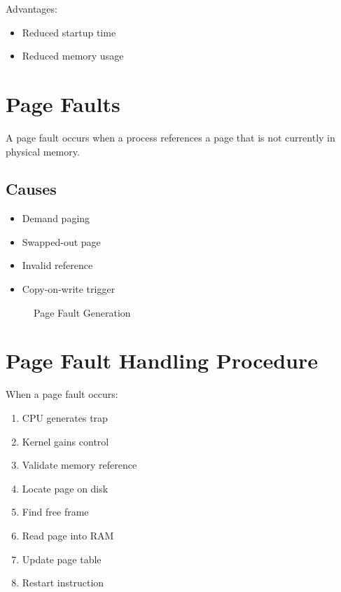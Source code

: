 Advantages:

\begin{itemize}
\item Reduced startup time
\item Reduced memory usage
\end{itemize}

\section{Page Faults}

A page fault occurs when a process references a page that is not currently in physical memory.

\subsection{Causes}

\begin{itemize}
\item Demand paging
\item Swapped-out page
\item Invalid reference
\item Copy-on-write trigger
\end{itemize}

\begin{figure}[H]
\centering
{}
\caption{Page Fault Generation}
\end{figure}

\section{Page Fault Handling Procedure}

When a page fault occurs:

\begin{enumerate}
\item CPU generates trap
\item Kernel gains control
\item Validate memory reference
\item Locate page on disk
\item Find free frame
\item Read page into RAM
\item Update page table
\item Restart instruction
\end{enumerate}

